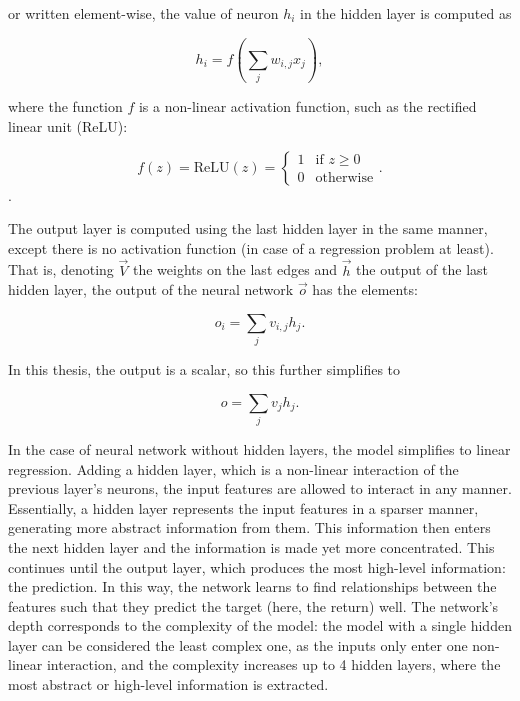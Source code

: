 		or written element-wise, the value of neuron $h_i$ in the hidden layer is computed as 
		
		\begin{equation*}
			h_i = f \left( \sum_{j}w_{i,j}x_j \right),
		\end{equation*}
		
		where the function $f$ is a non-linear activation function, such as the rectified linear unit (ReLU):
		
		\[
			f(z) = \text{ReLU}(z) =   
				\begin{cases}
					1 & \text{if } z \geq 0\\
					0 & \text{otherwise}
				\end{cases}.
		\]. 
		
		
		The output layer is computed using the last hidden layer in the same manner, except there is no activation function (in case of a regression problem at least). That is, denoting $\vec{V}$ the weights on the last edges and $\vec{h}$ the output of the last hidden layer, the output of the neural network $\vec{o}$ has the elements: 
		
		\begin{equation*}
			o_i = \sum_{j}v_{i,j} h_j.
		\end{equation*}
		
		In this thesis, the output is a scalar, so this further simplifies to 
		
		\begin{equation}
			o = \sum_{j}v_{j} h_j.
		\end{equation}
		
		In the case of neural network without hidden layers, the model simplifies to linear regression. Adding a hidden layer, which is a non-linear interaction of the previous layer's neurons, the input features are allowed to interact in any manner. Essentially, a hidden layer represents the input features in a sparser manner, generating more abstract information from them. This information then enters the next hidden layer and the information is made yet more concentrated. This continues until the output layer, which produces the most high-level information: the prediction. In this way, the network learns to find relationships between the features such that they predict the target (here, the return) well. The network's depth corresponds to the complexity of the model: the model with a single hidden layer can be considered the least complex one, as the inputs only enter one non-linear interaction, and the complexity increases up to 4 hidden layers, where the most abstract or high-level information is extracted.
		
